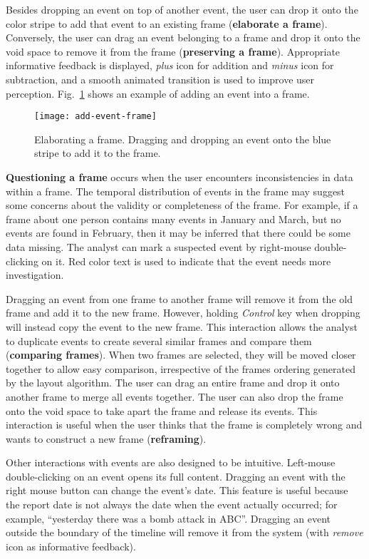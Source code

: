Besides dropping an event on top of another event, the user can drop it onto the color stripe to add that event to an existing frame (\textbf{elaborate a frame}). Conversely, the user can drag an event belonging to a frame and drop it onto the void space to remove it from the frame (\textbf{preserving a frame}). Appropriate informative feedback is displayed, \textit{plus} icon for addition and \textit{minus} icon for subtraction, and a smooth animated transition is used to improve user perception. Fig.~\ref{fig:drag-drop-note} shows an example of adding an event into a frame.
\begin{figure}[!htb]
	\centering
	\texttt{[image: add-event-frame]}
	\caption{Elaborating a frame. Dragging and dropping an event onto the blue stripe to add it to the frame.}
	\label{fig:drag-drop-note}
\end{figure}



\textbf{Questioning a frame} occurs when the user encounters inconsistencies in data within a frame. The temporal distribution of events in the frame may suggest some concerns about the validity or completeness of the frame. For example, if a frame about one person contains many events in January and March, but no events are found in February, then it may be inferred that there could be some data missing. The analyst can mark a suspected event by right-mouse double-clicking on it. Red color text is used to indicate that the event needs more investigation. 

Dragging an event from one frame to another frame will remove it from the old frame and add it to the new frame. However, holding \textit{Control} key when dropping will instead copy the event to the new frame. This interaction allows the analyst to duplicate events to create several similar frames and compare them (\textbf{comparing frames}). When two frames are selected, they will be moved closer together to allow easy comparison, irrespective of the frames ordering generated by the layout algorithm. The user can drag an entire frame and drop it onto another frame to merge all events together. The user can also drop the frame onto the void space to take apart the frame and release its events. This interaction is useful when the user thinks that the frame is completely wrong and wants to construct a new frame (\textbf{reframing}).

Other interactions with events are also designed to be intuitive. Left-mouse double-clicking on an event opens its full content. Dragging an event with the right mouse button can change the event's date. This feature is useful because the report date is not always the date when the event actually occurred; for example, ``yesterday there was a bomb attack in ABC''. Dragging an event outside the boundary of the timeline will remove it from the system (with \textit{remove} icon as informative feedback).


